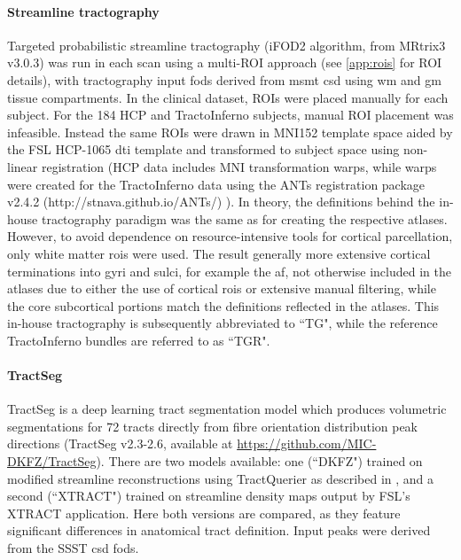 \paragraph*{Streamline tractography}

Targeted probabilistic streamline tractography (iFOD2 algorithm\autocite{Tournier2010}, from MRtrix3\autocite{Tournier2019} v3.0.3)  was run in each scan using a multi-ROI approach (see \ref{app:rois} for ROI details), with tractography input \glspl{fod} derived from \gls{msmt} \gls{csd} \autocite{Jeurissen2014} using \gls{wm} and \gls{gm} tissue compartments.
In the clinical dataset, ROIs were placed manually for each subject.
For the 184 HCP and TractoInferno subjects, manual ROI placement was infeasible.
Instead the same ROIs were drawn in MNI152 template space aided by the FSL HCP-1065 \gls{dti} template\autocite{FSLATLAS} and transformed to subject space using non-linear registration
(HCP data includes MNI transformation warps, while warps were created for the TractoInferno data using the ANTs registration package v2.4.2 (http://stnava.github.io/ANTs/) \autocite{Tustison2013,Avants2011}).
In theory, the definitions behind the in-house tractography paradigm was the same as for creating the respective atlases.
However, to avoid dependence on resource-intensive tools for cortical parcellation, only white matter \glspl{roi} were used.
The result generally more extensive cortical terminations into gyri and sulci, for example the \gls{af}, not otherwise included in the atlases due to either the use of cortical \glspl{roi} or extensive manual filtering, while the core subcortical portions match the definitions reflected in the atlases.
This in-house tractography is subsequently abbreviated to ``TG", while the reference TractoInferno bundles are referred to as ``TGR".

\paragraph*{TractSeg}

TractSeg \autocite{Wasserthal2018} is a deep learning tract segmentation model which produces volumetric segmentations for 72 tracts directly from fibre orientation distribution peak directions (TractSeg v2.3-2.6, available at \url{https://github.com/MIC-DKFZ/TractSeg}).
There are two models available: one (``DKFZ") trained on modified streamline reconstructions using TractQuerier \autocite{Wassermann2016} as described in \textcite{Wasserthal2018}, and a second (``XTRACT") trained on streamline density maps output by FSL's XTRACT application. \autocite{Warrington2020}
Here both versions are compared, as they feature significant differences in anatomical tract definition.
Input peaks were derived from the SSST \gls{csd} \glspl{fod}.

